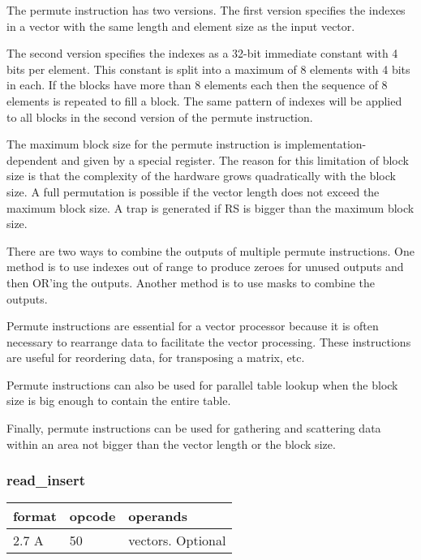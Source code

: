 \documentclass[forwardcom.tex]{subfiles}
\begin{document}
The permute instruction has two versions. The first version specifies the indexes in a vector with the same length and element size as the input vector.
\vspace{2mm}

The second version specifies the indexes as a 32-bit immediate constant with 4 bits per element. This constant is split into a maximum of 8 elements with 4 bits in each. If the blocks have more than 8 elements each then the sequence of 8 elements is repeated to fill a block. The same pattern of indexes will be applied to all blocks in the second version of the permute instruction.
\vspace{2mm}

The maximum block size for the permute instruction is implementation-dependent and given by a special register. The reason for this limitation of block size is that the complexity of the hardware grows quadratically with the block size. A full permutation is possible if the vector length does not exceed the maximum block size. A trap is generated if RS is bigger than the maximum block size.
\vspace{2mm}

There are two ways to combine the outputs of multiple permute instructions. One method is to use indexes out of range to produce zeroes for unused outputs and then OR'ing the outputs. Another method is to use masks to combine the outputs.
\vspace{2mm}

Permute instructions are essential for a vector processor because it is often necessary to rearrange data to facilitate the vector processing. These instructions are useful for reordering data, for transposing a matrix, etc. 
\vspace{2mm}

Permute instructions can also be used for parallel table lookup when the block size is big enough to contain the entire table.
\vspace{2mm}

Finally, permute instructions can be used for gathering and scattering data within an area not bigger than the vector length or the block size.

\subsubsection{read\_insert}
\label{table:readInsertInstruction}
\begin{tabular}{|p{12mm}|p{12mm}|p{110mm}|}
\hline
\bfseries format & \bfseries opcode & \bfseries operands \\ \hline
2.7 A & 50 & vectors. Optional \\ \hline
\end{tabular}
\vspace{2mm}
\end{document}
